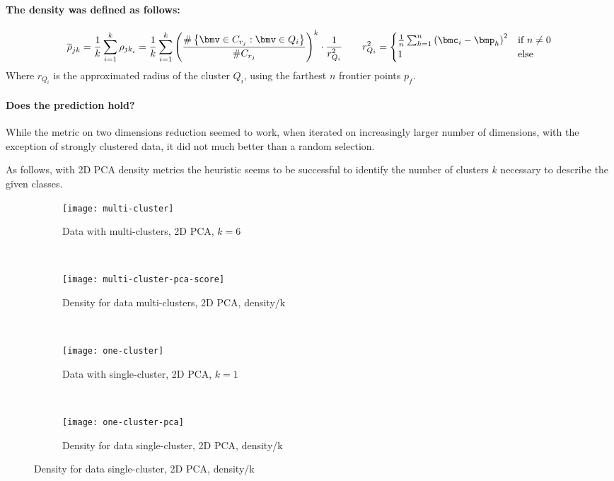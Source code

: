 \documentclass[\main/main.tex]{subfiles}
\begin{document}
\paragraph*{The density was defined as follows:}
\[
	\bar{\rho}_{jk} = \frac{1}{k} \sum_{i=1}^k \rho_{{jk}_i} = \frac{1}{k} \sum_{i=1}^k \rnd{\frac{\arity{\bmv \in C_{r_j}:\bmv \in Q_i}}{\#C_{r_j}}}^k \cdot \frac{1}{r_{Q_i}^2} \qquad r_{Q_i}^2 = \begin{cases}
		\frac{1}{n} \sum_{h=1}^{n} {(\bmc_i - \bmp_h)}^2 & \text{if \(n \neq 0\)} \\
		1                                                & \text{else}
	\end{cases}
\]
Where \(r_{Q_i}\) is the approximated radius of the cluster \(Q_i\), using the farthest \(n\) frontier points \(p_f\).

\paragraph*{Does the prediction hold?}
While the metric on two dimensions reduction seemed to work, when iterated on increasingly larger number of dimensions, with the exception of strongly clustered data, it did not much better than a random selection.

As follows, with 2D PCA density metrics the heuristic seems to be successful to identify the number of clusters \(k\) necessary to describe the given classes.
\begin{figure}
	\begin{subfigure}{0.24\textwidth}
		\texttt{[image: multi-cluster]}
		\caption{Data with multi-clusters, 2D PCA, \(k=6\)}
	\end{subfigure}
	~
	\begin{subfigure}{0.24\textwidth}
		\texttt{[image: multi-cluster-pca-score]}
		\caption{Density for data multi-clusters, 2D PCA, density/k}
	\end{subfigure}
	~
	\begin{subfigure}{0.24\textwidth}
		\texttt{[image: one-cluster]}
		\caption{Data with single-cluster, 2D PCA, \(k=1\)}
	\end{subfigure}
	~
	\begin{subfigure}{0.24\textwidth}
		\texttt{[image: one-cluster-pca]}
		\caption{Density for data single-cluster, 2D PCA, density/k}
	\end{subfigure}
\end{figure}
\end{document}
